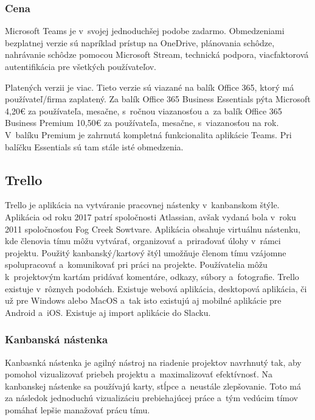 \subsubsection{Cena}
\indent Microsoft Teams je v svojej jednoduchšej podobe zadarmo. Obmedzeniami bezplatnej verzie sú napríklad prístup na OneDrive, plánovania schôdze, nahrávanie schôdze pomocou Microsoft Stream, technická podpora, viacfaktorová autentifikácia pre všetkých používateľov. 

\indent Platených verzii je viac. Tieto verzie sú viazané na balík Office 365, ktorý má používateľ/firma zaplatený. Za balík Office 365 Business Essentials pýta Microsoft 4,20€ za používateľa, mesačne, s ročnou viazanosťou a za balík Office 365 Business Premium 10,50€ za používateľa, mesačne, s viazanosťou na rok. V balíku Premium je zahrnutá kompletná funkcionalita aplikácie Teams. Pri balíčku Essentials sú tam stále isté obmedzenia.

\subsection{Trello}
\indent Trello je aplikácia na vytváranie pracovnej nástenky v kanbanskom štýle. Aplikácia od roku 2017 patrí spoločnosti Atlassian, avšak vydaná bola v roku 2011 spoločnosťou Fog Creek Sowtvare. Aplikácia obsahuje virtuálnu nástenku, kde členovia tímu môžu vytvárať, organizovať a priraďovať úlohy v rámci projektu. Použitý kanbanský/kartový štýl umožňuje členom tímu vzájomne spolupracovať a komunikovať pri práci na projekte. Používatelia môžu k projektovým kartám pridávať komentáre, odkazy, súbory a fotografie. Trello existuje v rôznych podobách. Existuje webová aplikácia, desktopová aplikácia, či už pre Windows alebo MacOS a tak isto existujú aj mobilné aplikácie pre Android a iOS. Existuje aj import aplikácie do Slacku.
\subsubsection{Kanbanská nástenka}
\indent Kanbasnká nástenka je agilný nástroj na riadenie projektov navrhnutý tak, aby pomohol vizualizovať priebeh projektu a maximalizovať efektívnosť. Na kanbanskej nástenke sa používajú karty, stĺpce a neustále zlepšovanie. Toto má za následok jednoduchú vizualizáciu prebiehajúcej práce a tým vedúcim tímov pomáhať lepšie manažovať prácu tímu. 

